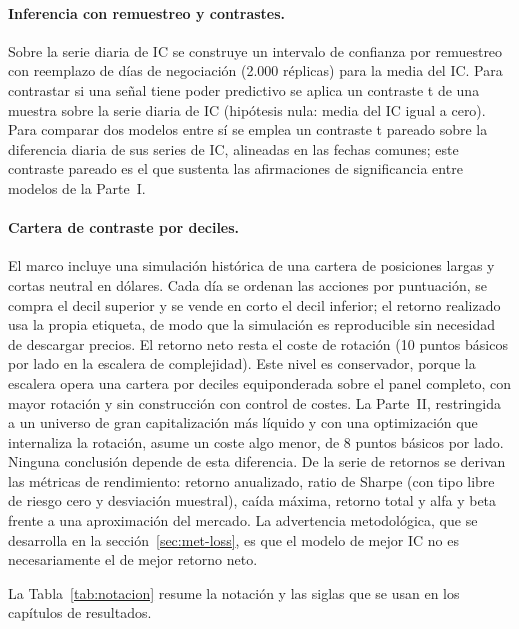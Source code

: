 \paragraph{Inferencia con remuestreo y contrastes.} Sobre la serie diaria de IC se
construye un intervalo de confianza por remuestreo con reemplazo de días de negociación
(2.000 réplicas) para la media del IC. Para contrastar si una señal tiene poder predictivo
se aplica un contraste t de una muestra sobre la serie diaria de IC (hipótesis nula: media
del IC igual a cero). Para comparar dos modelos entre sí se emplea un contraste t pareado
sobre la diferencia diaria de sus series de IC, alineadas en las fechas comunes; este
contraste pareado es el que sustenta las afirmaciones de significancia entre modelos de la
Parte~I.

\paragraph{Cartera de contraste por deciles.} El marco incluye una simulación histórica de
una cartera de posiciones largas y cortas neutral en dólares. Cada día se ordenan las
acciones por puntuación, se compra el decil superior y se vende en corto el decil
inferior; el retorno realizado usa la propia etiqueta, de modo que la simulación es
reproducible sin necesidad de descargar precios. El retorno neto resta el coste de
rotación (10 puntos básicos por lado en la escalera de complejidad). Este nivel es
conservador, porque la escalera opera una cartera por deciles equiponderada sobre el panel
completo, con mayor rotación y sin construcción con control de costes. La Parte~II,
restringida a un universo de gran capitalización más líquido y con una optimización que
internaliza la rotación, asume un coste algo menor, de 8 puntos básicos por lado. Ninguna
conclusión depende de esta diferencia. De la serie de retornos se derivan las métricas de
rendimiento: retorno anualizado, ratio de Sharpe (con tipo libre de riesgo cero y
desviación muestral), caída máxima, retorno total y alfa y beta frente a una aproximación
del mercado. La advertencia metodológica, que se desarrolla en la
sección~\ref{sec:met-loss}, es que el modelo de mejor IC no es necesariamente el de mejor
retorno neto.

La Tabla~\ref{tab:notacion} resume la notación y las siglas que se usan en los
capítulos de resultados.

